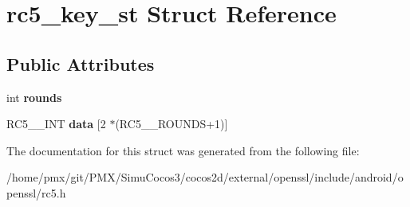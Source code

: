 \hypertarget{structrc5__key__st}{}\section{rc5\+\_\+key\+\_\+st Struct Reference}
\label{structrc5__key__st}
\subsection*{Public Attributes}
\begin{DoxyCompactItemize}
\item 
\mbox{\label{structrc5__key__st_ad9106df6b5ba463da94185b253798fd3}} 
int {\bfseries rounds}
\item 
\mbox{\label{structrc5__key__st_af4156331b3d0165be67b7afecabd7bc9}} 
R\+C5\+\_\+\_\+\+I\+NT {\bfseries data} \mbox{[}2 $\ast$(R\+C5\+\_\+\_\+\+R\+O\+U\+N\+DS+1)\mbox{]}
\end{DoxyCompactItemize}


The documentation for this struct was generated from the following file\+:\begin{DoxyCompactItemize}
\item 
/home/pmx/git/\+P\+M\+X/\+Simu\+Cocos3/cocos2d/external/openssl/include/android/openssl/rc5.\+h\end{DoxyCompactItemize}
